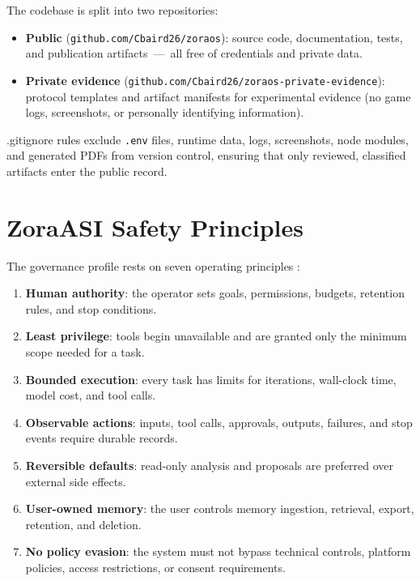 \documentclass[11pt]{article}
\begin{document}
The codebase is split into two repositories:
\begin{itemize}[leftmargin=*]
  \item \textbf{Public} (\texttt{github.com/Cbaird26/zoraos}): source code, documentation, tests, and publication artifacts\ ---\ all free of credentials and private data.
  \item \textbf{Private evidence} (\texttt{github.com/Cbaird26/zoraos-private-evidence}): protocol templates and artifact manifests for experimental evidence (no game logs, screenshots, or personally identifying information).
\end{itemize}

.gitignore rules exclude \texttt{.env} files, runtime data, logs, screenshots, node modules, and generated PDFs from version control, ensuring that only reviewed, classified artifacts enter the public record.

\section{ZoraASI Safety Principles}

The governance profile rests on seven operating principles \citep{shneiderman2020human, nist2023airmf}:

\begin{enumerate}[leftmargin=*]
  \item \textbf{Human authority}: the operator sets goals, permissions, budgets, retention rules, and stop conditions.
  \item \textbf{Least privilege}: tools begin unavailable and are granted only the minimum scope needed for a task.
  \item \textbf{Bounded execution}: every task has limits for iterations, wall-clock time, model cost, and tool calls.
  \item \textbf{Observable actions}: inputs, tool calls, approvals, outputs, failures, and stop events require durable records.
  \item \textbf{Reversible defaults}: read-only analysis and proposals are preferred over external side effects.
  \item \textbf{User-owned memory}: the user controls memory ingestion, retrieval, export, retention, and deletion.
  \item \textbf{No policy evasion}: the system must not bypass technical controls, platform policies, access restrictions, or consent requirements.
\end{enumerate}
\end{document}
